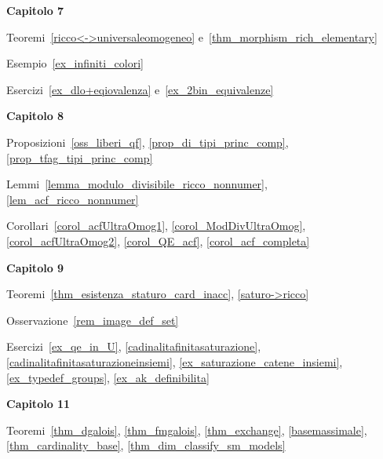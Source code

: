 \textbf{Capitolo 7}

Teoremi~\ref{ricco<->universaleomogeneo} e~\ref{thm_morphism_rich_elementary}

Esempio~\ref{ex_infiniti_colori} 

Esercizi~\ref{ex_dlo+eqiovalenza} e~\ref{ex_2bin_equivalenze}

\textbf{Capitolo 8}

Proposizioni~\ref{oss_liberi_qf}, \ref{prop_di_tipi_princ_comp}, \ref{prop_tfag_tipi_princ_comp}

Lemmi~\ref{lemma_modulo_divisibile_ricco_nonnumer}, \ref{lem_acf_ricco_nonnumer}

Corollari~\ref{corol_acfUltraOmog1}, \ref{corol_ModDivUltraOmog}, \ref{corol_acfUltraOmog2}, \ref{corol_QE_acf}, \ref{corol_acf_completa}

\textbf{Capitolo 9}

Teoremi~\ref{thm_esistenza_staturo_card_inacc}, \ref{saturo->ricco}

Osservazione~\ref{rem_image_def_set}

Esercizi~\ref{ex_qe_in_U}, \ref{cadinalitafinitasaturazione},  \ref{cadinalitafinitasaturazioneinsiemi},  \ref{ex_saturazione_catene_insiemi}, \ref{ex_typedef_groups}, \ref{ex_ak_definibilita}

\textbf{Capitolo 11}

Teoremi~\ref{thm_dgalois}, \ref{thm_fmgalois}, \ref{thm_exchange}, \ref{basemassimale}, \ref{thm_cardinality_base}, \ref{thm_dim_classify_sm_models}